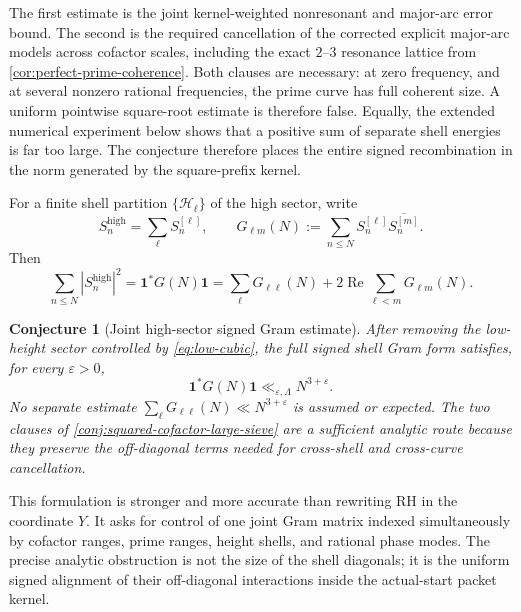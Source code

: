 \documentclass[11pt]{article}
\newtheorem{conjecture}[theorem]{Conjecture}
\theoremstyle{definition}
\theoremstyle{remark}
\newcommand{\eps}{\varepsilon}
\newcommand{\1}{\mathbf{1}}
\newcommand{\Repart}{\operatorname{Re}}
\begin{document}
The first estimate is the joint kernel-weighted nonresonant and major-arc error
bound.  The second is the required cancellation of the corrected explicit
major-arc models across cofactor scales, including the exact $2$--$3$ resonance
lattice from \cref{cor:perfect-prime-coherence}.  Both clauses are necessary:
at zero frequency, and at several nonzero rational frequencies, the prime curve
has full coherent size.  A uniform pointwise square-root estimate is therefore
false.  Equally, the extended numerical experiment below shows that a positive
sum of separate shell energies is far too large.  The conjecture therefore places
the entire signed recombination in the norm generated by the square-prefix kernel.

For a finite shell partition $\{\mathscr H_\ell\}$ of the high sector, write
\begin{equation}
 S_n^{\mathrm{high}}=\sum_{\ell}S_n^{[\ell]},
 \qquad
 G_{\ell m}(N):=\sum_{n\le N}
 S_n^{[\ell]}\overline{S_n^{[m]}}.
 \label{eq:height-shell-Gram}
\end{equation}
Then
\begin{equation}
 \boxed{
 \sum_{n\le N}|S_n^{\mathrm{high}}|^2
 =\mathbf 1^*G(N)\mathbf 1
 =\sum_\ell G_{\ell\ell}(N)
 +2\Repart\sum_{\ell<m}G_{\ell m}(N).
 }
 \label{eq:height-shell-recombination}
\end{equation}

\begin{conjecture}[Joint high-sector signed Gram estimate]
\label{conj:high-kernel}
After removing the low-height sector controlled by \cref{eq:low-cubic}, the
full signed shell Gram form satisfies, for every $\eps>0$,
\begin{equation}
 \boxed{
 \mathbf 1^*G(N)\mathbf 1
 \ll_{\eps,\Lambda}N^{3+\eps}.
 }
 \label{eq:high-kernel-bound}
\end{equation}
No separate estimate $\sum_\ell G_{\ell\ell}(N)\ll N^{3+\eps}$ is assumed or
expected.  The two clauses of \cref{conj:squared-cofactor-large-sieve} are a
sufficient analytic route because they preserve the off-diagonal terms needed for
cross-shell and cross-curve cancellation.
\end{conjecture}

This formulation is stronger and more accurate than rewriting RH in the coordinate
$Y$.  It asks for control of one joint Gram matrix indexed simultaneously by
cofactor ranges, prime ranges, height shells, and rational phase modes.  The precise
analytic obstruction is not the size of the shell diagonals; it is the uniform
signed alignment of their off-diagonal interactions inside the actual-start packet
kernel.
\end{document}
